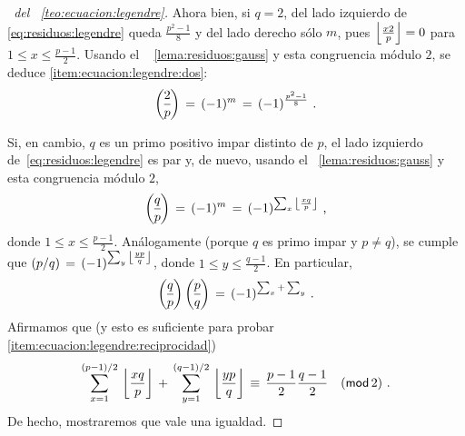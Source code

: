 \begin{proof}[\proofname~del \teoname~\ref{teo:ecuacion:legendre}]
	Ahora bien, si $q=2$, del lado izquierdo de~%
	\eqref{eq:residuos:legendre} queda $\frac{p^2-1} 8$ y del lado
	derecho s\'olo $m$, pues $\left\lfloor{\frac{x2} p}\right\rfloor=0$ para
	$1\leq x\leq\frac{p-1} 2$. Usando el \lemaname~%
	\ref{lema:residuos:gauss} y esta congruencia m\'odulo $2$,
	se deduce \eqref{item:ecuacion:legendre:dos}:
	\begin{displaymath}
		\legendre 2 p\,=\,(-1)^m\,=\,(-1)^{\frac{p^2-1} 8}
		\text{ .}
	\end{displaymath}

	Si, en cambio, $q$ es un primo positivo impar distinto de $p$,
	el lado izquierdo de~\eqref{eq:residuos:legendre} es par y,
	de nuevo, usando el \lemaname~\ref{lema:residuos:gauss} y esta
	congruencia m\'odulo $2$,
	\begin{displaymath}
		\legendre q p\,=\,(-1)^m\,=\,(-1)^{\sum_x\,\piso{\frac{xq} p}}
		\text{ ,}
	\end{displaymath}
	donde $1\leq x\leq\frac{p-1} 2$.
	An\'alogamente (porque $q$ es primo impar y $p\neq q$), se cumple que
	\begin{math}
		\left({p}/{q}\right)\,=\,(-1)^{\sum_y\,\left\lfloor{\frac{yp} q}\right\rfloor}
	\end{math},
	donde $1\leq y\leq\frac{q-1} 2$. En particular,
	\begin{displaymath}
		\legendre q p\,\legendre p q\,=\,(-1)^{\sum_x+\sum_y}
		\text{ .}
	\end{displaymath}
	Afirmamos que (y esto es suficiente para probar~%
	\eqref{item:ecuacion:legendre:reciprocidad})
	\begin{equation}
		\label{eq:residuos:legendre:reciprocidad}
		\sum_{x=1}^{(p-1)/2}\,\piso{\frac{xq} p}\,+\,
			\sum_{y=1}^{(q-1)/2}\,\piso{\frac{yp} q}\,\equiv\,
			\frac{p-1} 2\frac{q-1} 2\modulo[2]
		\text{ .}
	\end{equation}
	De hecho, mostraremos que vale una igualdad.


\end{proof}
